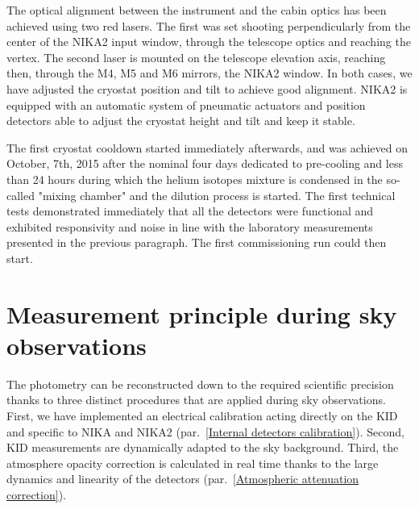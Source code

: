 \documentclass[]{aa} %
\begin{document}
The optical alignment between the instrument and the cabin optics has been achieved using two red lasers. The first was set shooting perpendicularly from the center of the NIKA2 input window, through the telescope optics and reaching the vertex. The second laser is mounted on the telescope elevation axis, reaching then, through the M4, M5 and M6 mirrors, the NIKA2 window. In both cases, we have adjusted the cryostat position and tilt to achieve good alignment. NIKA2 is equipped with an automatic system of pneumatic actuators and position detectors able to adjust the cryostat height and tilt and keep it stable. 

The first cryostat cooldown started immediately afterwards, and was achieved on October, 7th, 2015 after the nominal four days dedicated to pre-cooling and less than 24 hours during which the helium isotopes mixture is condensed in the so-called "mixing chamber" and the dilution process is started. The first technical tests demonstrated immediately that all the detectors were functional and exhibited responsivity and noise in line with the laboratory measurements presented in the previous paragraph. The first commissioning run could then start.





\section{Measurement principle during sky observations}

The photometry can be reconstructed down to the required scientific precision thanks to three distinct procedures that are applied during sky observations. First, we have implemented an electrical calibration acting directly on the KID and specific to NIKA and NIKA2 (par.~\ref{Internal detectors calibration}). Second, KID measurements are dynamically adapted to the sky background.
Third, the atmosphere opacity correction is calculated in real time thanks to the large dynamics and linearity of the detectors (par.~\ref{Atmospheric attenuation correction}).
\end{document}
